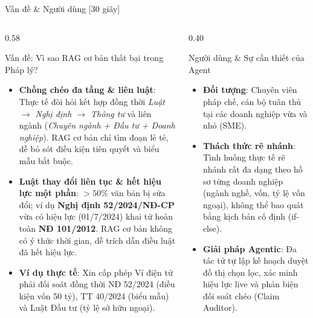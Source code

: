 \documentclass[aspectratio=169,10pt]{beamer}
\begin{document}
\begin{frame}{Vấn đề \& Người dùng [30 giây]}
\begin{columns}[T]
\begin{column}{0.58\textwidth}
\begin{block}{\small Vấn đề: Vì sao RAG cơ bản thất bại trong Pháp lý?}
\begin{itemize}\footnotesize
  \item \textbf{Chồng chéo đa tầng \& liên luật}: Thực tế đòi hỏi kết hợp đồng thời \textit{Luật $\rightarrow$ Nghị định $\rightarrow$ Thông tư} và liên ngành (\textit{Chuyên ngành + Đầu tư + Doanh nghiệp}). RAG cơ bản chỉ tìm đoạn lẻ tẻ, dễ bỏ sót điều kiện tiên quyết và biểu mẫu bắt buộc.
  \item \textbf{Luật thay đổi liên tục \& hết hiệu lực một phần}: $>50\%$ văn bản bị sửa đổi; ví dụ \textbf{Nghị định 52/2024/NĐ-CP} vừa có hiệu lực (01/7/2024) khai tử hoàn toàn \textbf{NĐ 101/2012}. RAG cơ bản không có ý thức thời gian, dễ trích dẫn điều luật đã hết hiệu lực.
  \item \textbf{Ví dụ thực tế}: Xin cấp phép Ví điện tử phải đối soát đồng thời NĐ 52/2024 (điều kiện vốn 50 tỷ), TT 40/2024 (biểu mẫu) và Luật Đầu tư (tỷ lệ sở hữu ngoại).
\end{itemize}
\end{block}
\end{column}
\begin{column}{0.40\textwidth}
\begin{block}{\small Người dùng \& Sự cần thiết của Agent}
\begin{itemize}\footnotesize
  \item \textbf{Đối tượng}: Chuyên viên pháp chế, cán bộ tuân thủ tại các doanh nghiệp vừa và nhỏ (SME).
  \item \textbf{Thách thức rẽ nhánh}: Tình huống thực tế rẽ nhánh rất đa dạng theo hồ sơ từng doanh nghiệp (ngành nghề, vốn, tỷ lệ vốn ngoại), không thể bao quát bằng kịch bản cố định (if-else).
  \item \textbf{Giải pháp Agentic}: Đa tác tử tự lập kế hoạch duyệt đồ thị chọn lọc, xác minh hiệu lực live và phản biện đối soát chéo (Claim Auditor).
\end{itemize}
\end{block}
\end{column}
\end{columns}
\end{frame}
\end{document}
